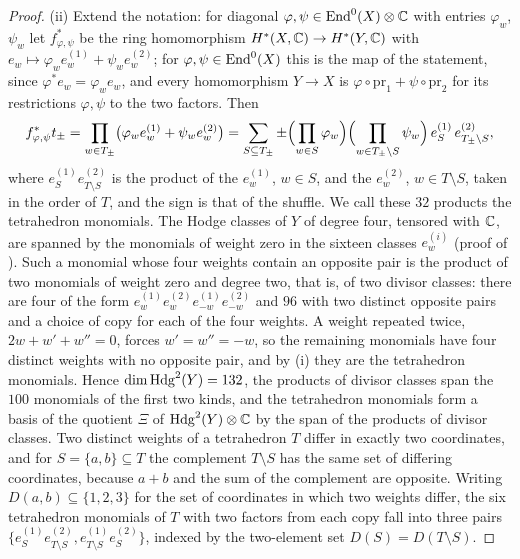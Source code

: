 \begin{proof}
(ii) Extend the notation: for diagonal $\varphi,\psi\in\operatorname{End}^{0}(X)\otimes\mathbb{C}$
with entries $\varphi_{w}$, $\psi_{w}$ let $f_{\varphi,\psi}^{*}$ be the ring
homomorphism $H^{*}(X,\mathbb{C})\to H^{*}(Y,\mathbb{C})$ with
$e_{w}\mapsto\varphi_{w}e^{(1)}_{w}+\psi_{w}e^{(2)}_{w}$; for
$\varphi,\psi\in\operatorname{End}^{0}(X)$ this is the map of the statement, since
$\varphi^{*}e_{w}=\varphi_{w}e_{w}$, and every homomorphism $Y\to X$ is
$\varphi\circ\mathrm{pr}_{1}+\psi\circ\mathrm{pr}_{2}$ for its restrictions
$\varphi,\psi$ to the two factors. Then
\begin{equation}\label{eq:pullbacktet}
  f_{\varphi,\psi}^{*}t_{\pm}
  =\prod_{w\in T_{\pm}}\bigl(\varphi_{w}e^{(1)}_{w}+\psi_{w}e^{(2)}_{w}\bigr)
  =\sum_{S\subseteq T_{\pm}}\pm\Bigl(\prod_{w\in S}\varphi_{w}\Bigr)
  \Bigl(\prod_{w\in T_{\pm}\setminus S}\psi_{w}\Bigr)\,
  e^{(1)}_{S}\,e^{(2)}_{T_{\pm}\setminus S},
\end{equation}
where $e^{(1)}_{S}e^{(2)}_{T\setminus S}$ is the product of the $e^{(1)}_{w}$,
$w\in S$, and the $e^{(2)}_{w}$, $w\in T\setminus S$, taken in the order of
$T$, and the sign is that of the shuffle. We call these $32$ products the
tetrahedron monomials. The Hodge classes of $Y$ of degree four, tensored with
$\mathbb{C}$, are spanned by the monomials of weight zero in the sixteen classes
$e^{(i)}_{w}$ (proof of ). Such a monomial whose four
weights contain an opposite pair is the product of two monomials of weight
zero and degree two, that is, of two divisor classes: there are four of the
form $e^{(1)}_{w}e^{(2)}_{w}e^{(1)}_{-w}e^{(2)}_{-w}$ and $96$ with two
distinct opposite pairs and a choice of copy for each of the four weights.
A weight repeated twice, $2w+w'+w''=0$, forces $w'=w''=-w$, so the remaining
monomials have four distinct weights with no opposite pair, and by (i) they
are the tetrahedron monomials. Hence $\dim\mathrm{Hdg}^{2}(Y)=132$, the products of
divisor classes span the $100$ monomials of the first two kinds, and the
tetrahedron monomials form a basis of the quotient $\Xi$ of
$\mathrm{Hdg}^{2}(Y)\otimes\mathbb{C}$ by the span of the products of divisor classes. Two
distinct weights of a tetrahedron $T$ differ in exactly two coordinates, and
for $S=\{a,b\}\subseteq T$ the complement $T\setminus S$ has the same set of
differing coordinates, because $a+b$ and the sum of the complement are
opposite. Writing $D(a,b)\subseteq\{1,2,3\}$ for the set of coordinates in
which two weights differ, the six tetrahedron monomials of $T$ with two
factors from each copy fall into three pairs
$\{e^{(1)}_{S}e^{(2)}_{T\setminus S},e^{(1)}_{T\setminus S}e^{(2)}_{S}\}$,
indexed by the two-element set $D(S)=D(T\setminus S)$.


\end{proof}
